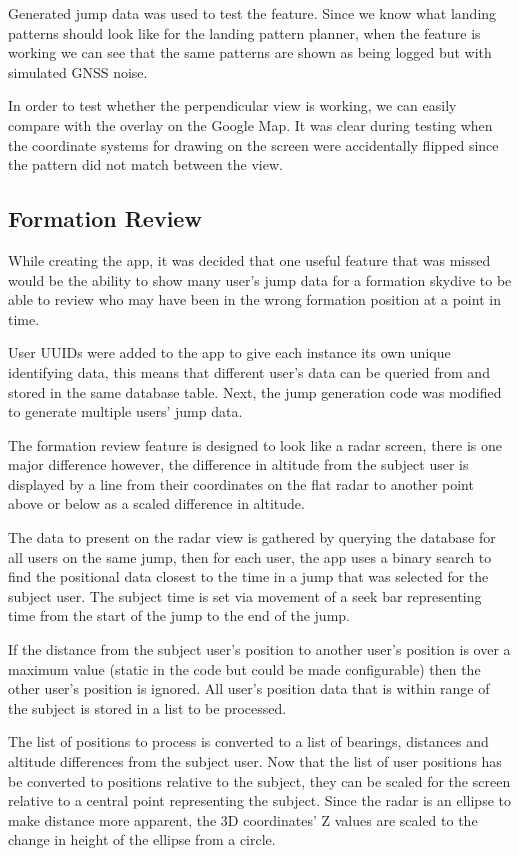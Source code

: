 Generated jump data was used to test the feature. Since we know what landing patterns should look like for the landing pattern planner, when the feature is working we can see that the same patterns are shown as being logged but with simulated GNSS noise.

In order to test whether the perpendicular view is working, we can easily compare with the overlay on the Google Map. It was clear during testing when the coordinate systems for drawing on the screen were accidentally flipped since the pattern did not match between the view.

\subsection{Formation Review}\label{subsec:formation-review}
While creating the app, it was decided that one useful feature that was missed would be the ability to show many user's jump data for a formation skydive to be able to review who may have been in the wrong formation position at a point in time.

User UUIDs were added to the app to give each instance its own unique identifying data, this means that different user's data can be queried from and stored in the same database table. Next, the jump generation code was modified to generate multiple users' jump data.

The formation review feature is designed to look like a radar screen, there is one major difference however, the difference in altitude from the subject user is displayed by a line from their coordinates on the flat radar to another point above or below as a scaled difference in altitude.

The data to present on the radar view is gathered by querying the database for all users on the same jump, then for each user, the app uses a binary search to find the positional data closest to the time in a jump that was selected for the subject user. The subject time is set via movement of a seek bar representing time from the start of the jump to the end of the jump.

If the distance from the subject user's position to another user's position is over a maximum value (static in the code but could be made configurable) then the other user's position is ignored. All user's position data that is within range of the subject is stored in a list to be processed.

The list of positions to process is converted to a list of bearings, distances and altitude differences from the subject user. Now that the list of user positions has be converted to positions relative to the subject, they can be scaled for the screen relative to a central point representing the subject. Since the radar is an ellipse to make distance more apparent, the 3D coordinates' Z values are scaled to the change in height of the ellipse from a circle.

